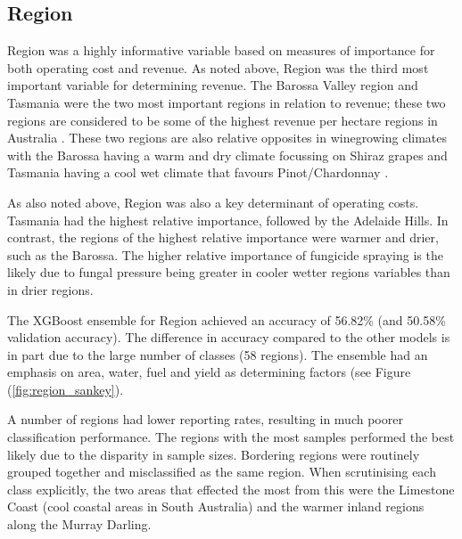 \documentclass[review,12pt,authoryear]{elsarticle}
\begin{document}
\begin{linenumbers}
\subsection{Region}

 

Region was a highly informative variable based on measures of importance for both operating cost and revenue. As noted above, Region was the third most important variable for determining revenue. The Barossa Valley region and Tasmania were the two most important regions in relation to revenue; these two regions are considered to be some of the highest revenue per hectare regions in Australia \citep{wineaustraliaNationalVintageReport2022}. These two regions are also relative opposites in winegrowing climates with the Barossa having a warm and dry climate focussing on Shiraz grapes and Tasmania having a cool wet climate that favours Pinot/Chardonnay \citep{wineaustraliaNationalVintageReport2022}.
\par
As also noted above, Region was also a key determinant of operating costs. Tasmania had the highest relative importance, followed by the Adelaide Hills. In contrast, the regions of the highest relative importance were warmer and drier, such as the Barossa. The higher relative importance of fungicide spraying is the likely due to fungal pressure being greater in cooler wetter regions variables than in drier regions.
\par
The XGBoost ensemble for Region achieved an accuracy of 56.82\% (and 50.58\% validation accuracy). The difference in accuracy compared to the other models is in part due to the large number of classes (58 regions). The ensemble had an emphasis on area, water, fuel and yield as determining factors (see Figure (\ref{fig:region_sankey}).
\par
A number of regions had lower reporting rates, resulting in much poorer classification performance. The regions with the most samples performed the best likely due to the disparity in sample sizes. Bordering regions were routinely grouped together and misclassified as the same region. When scrutinising each class explicitly, the two areas that effected the most from this were the Limestone Coast (cool coastal areas in South Australia) and the warmer inland regions along the Murray Darling.


\end{linenumbers}
\end{document}
